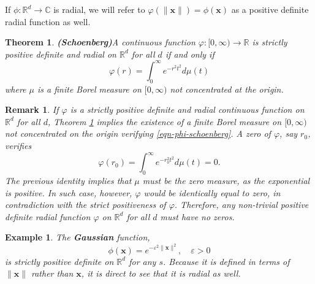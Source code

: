 \documentclass[12pt]{report} %
\newtheorem{theorem}{Theorem}
\newtheorem{example}{Example}
\newtheorem{remark}{Remark}
\newcommand{\tmmathbf}[1]{\ensuremath{\boldsymbol{#1}}}
\newcommand{\tmstrong}[1]{\textbf{#1}}
\begin{document}
If $\phi : \mathbb{R}^d \rightarrow \mathbb{C}$ is radial, we will refer to
$\varphi (\| \tmmathbf{x} \|) = \phi (\tmmathbf{x})$ as a positive definite
radial function as well.

\begin{theorem}
  {\tmstrong{(Schoenberg)}}\label{thm-schoenberg} A continuous function
  $\varphi : [0, \infty) \rightarrow \mathbb{R}$ is strictly positive definite
  and radial on $\mathbb{R}^d$ for all $d$ if and only if
  \begin{equation}
    \varphi (r) = \int_0^{\infty} e^{- r^2 t^2} d \mu (t)
    \label{eqn-phi-schoenberg}
  \end{equation}
  where $\mu$ is a finite Borel measure on $[0, \infty)$ not
  concentrated at the origin.
\end{theorem}

\begin{remark}
  If $\varphi$ is a strictly positive definite and radial continuous function
  on $\mathbb{R}^d$ for all $d$, Theorem \ref{thm-schoenberg} implies the
  existence of a finite Borel measure on $[0, \infty)$ not
  concentrated on the origin verifying \eqref{eqn-phi-schoenberg}. A zero of
  $\varphi$, say $r_0$, verifies
  \[ \varphi (r_0) = \int_0^{\infty} e^{- r_0^2 t^2} d \mu (t) = 0. \]
  The previous identity implies that $\mu$ must be the zero measure, as the
  exponential is positive. In such case, however, $\varphi$ would be
  identically equal to zero, in contradiction with the strict positiveness of
  $\varphi$. Therefore, any non-trivial positive definite radial function
  $\varphi$ on $\mathbb{R}^d$ for all $d$ must have no zeros.
\end{remark}

\begin{example}\label{ex-gaussian-strictly-positive-definite}
  The {\tmstrong{Gaussian}} function,
  \[ \phi (\tmmathbf{x}) = e^{- \varepsilon^2 \| \tmmathbf{x} \|^2}, \quad
     \varepsilon > 0 \]
  is strictly positive definite on $\mathbb{R}^d$ for any $s$. Because it is
  defined in terms of $\| \tmmathbf{x} \|$ rather than $\tmmathbf{x}$, it is
  direct to see that it is radial as well.
  
 
\end{example}
\end{document}
